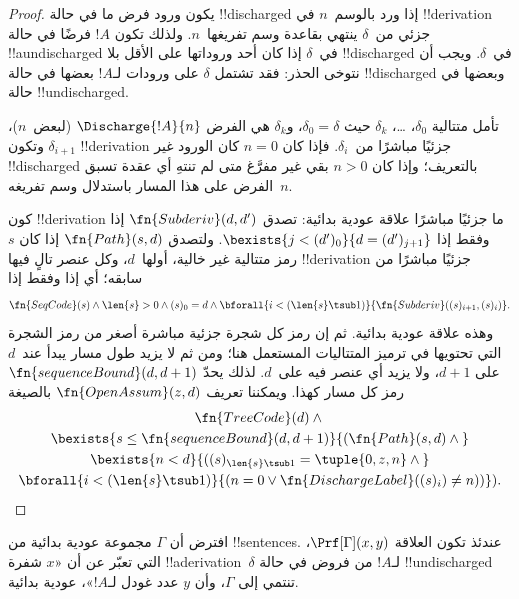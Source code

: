 \documentclass[../../../include/open-logic-section]{subfiles}
\begin{document}
\begin{proof}
  يكون ورود فرض ما في حالة !!{discharged} إذا ورد بالوسم~$n$ في
  !!{derivation} جزئي من~$\delta$ ينتهي بقاعدة وسم تفريغها~$n$. ولذلك
  تكون $!A$ فرضًا في حالة !!a{undischarged} في~$\delta$ إذا كان أحد وروداتها
  على الأقل بلا !!{discharged} في~$\delta$. ويجب أن نتوخى الحذر: فقد تشتمل
  $\delta$ على ورودات لـ$!A$ بعضها في حالة !!{discharged} وبعضها
  في حالة !!{undischarged}.

  تأمل متتالية $\delta_0$، \dots، $\delta_k$ حيث $\delta_0=\delta$،
  و$\delta_k$ هي الفرض $\Discharge{!A}{n}$ (لبعض~$n$)، وتكون
  $\delta_{i+1}$ !!{derivation} جزئيًا مباشرًا من~$\delta_i$. فإذا كان
  $n=0$ كان الورود غير !!{discharged} بالتعريف؛ وإذا كان $n>0$ بقي غير مفرَّغ
  متى لم تنتهِ أي عقدة تسبق الفرض على هذا المسار باستدلال وسم تفريغه~$n$.

  كون !!{derivation} ما جزئيًا مباشرًا علاقة عودية بدائية: تصدق
  $\fn{Subderiv}(d,d')$ إذا وفقط إذا
  $\bexists{j<(d')_0}{d=(d')_{j+1}}$. ولتصدق $\fn{Path}(s,d)$ إذا كان
  $s$ رمز متتالية غير خالية، أولها~$d$، وكل عنصر تالٍ فيها !!{derivation}
  جزئيًا مباشرًا من سابقه؛ أي إذا وفقط إذا
  \[
    \fn{SeqCode}(s) \land \len{s}>0 \land (s)_0=d \land
    \bforall{i<(\len{s}\tsub 1)}{\fn{Subderiv}((s)_{i+1},(s)_i)}.
  \]
  وهذه علاقة عودية بدائية. ثم إن رمز كل شجرة جزئية مباشرة أصغر من رمز
  الشجرة التي تحتويها في ترميز المتتاليات المستعمل هنا؛ ومن ثم لا يزيد
  طول مسار يبدأ عند~$d$ على $d+1$، ولا يزيد أي عنصر فيه على~$d$.
  لذلك يحدّ $\fn{sequenceBound}(d,d+1)$ رمز كل مسار كهذا. ويمكننا تعريف
  $\fn{OpenAssum}(z,d)$ بالصيغة
  \begin{multline*}
    \fn{TreeCode}(d) \land {}\\
    \bexists{s\leq\fn{sequenceBound}(d,d+1)}{(\fn{Path}(s,d) \land {}} \\
    \bexists{n<d}{((s)_{\len{s} \tsub 1} = \tuple{0, z, n} \land {}}\\
      \bforall{i<(\len{s} \tsub 1)}{(n=0 \lor
      \fn{DischargeLabel}((s)_i) \neq n))}).
  \end{multline*}
\end{proof}

\begin{prop}
  افترض أن $\Gamma$ مجموعة عودية بدائية من !!{sentence}s. عندئذ تكون
  العلاقة $\Prf[\Gamma](x,y)$، التي تعبّر عن أن «$x$ شفرة
  !!a{derivation}~$\delta$ لـ$!A$ من فروض في حالة !!{undischarged} تنتمي إلى
  $\Gamma$، وأن $y$ عدد غودل لـ$!A$»، عودية بدائية.
\end{prop}
\end{document}
